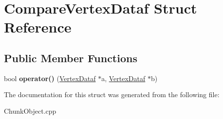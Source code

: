 \hypertarget{structCompareVertexDataf}{\section{\-Compare\-Vertex\-Dataf \-Struct \-Reference}
\label{structCompareVertexDataf}
}
\subsection*{\-Public \-Member \-Functions}
\begin{DoxyCompactItemize}
\item 
\hypertarget{structCompareVertexDataf_ab5bcae7b72fb692d1d69d75bb0756c01}{bool {\bfseries operator()} (\hyperlink{structVertexDataf}{\-Vertex\-Dataf} $\ast$a, \hyperlink{structVertexDataf}{\-Vertex\-Dataf} $\ast$b)}\label{structCompareVertexDataf_ab5bcae7b72fb692d1d69d75bb0756c01}

\end{DoxyCompactItemize}


\-The documentation for this struct was generated from the following file\-:\begin{DoxyCompactItemize}
\item 
\-Chunk\-Object.\-cpp\end{DoxyCompactItemize}
